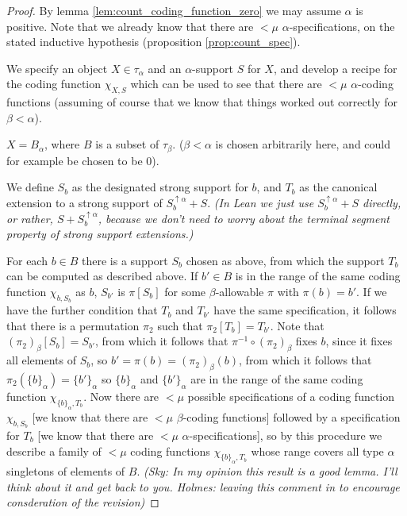 \documentclass[112pt]{article}
\theoremstyle{definition}
\theoremstyle{remark}
\newcommand{\rk}[1]{{\color{blue}\sl #1}}
\newcommand{\rk}[1]{}
\begin{document}
\begin{proof}


{By lemma \ref{lem:count_coding_function_zero} we may assume $\alpha$ is positive.}
Note that we already know that there are $<\mu$ $\alpha$-specifications, on the stated inductive hypothesis {(proposition \ref{prop:count_spec})}.

We specify an object $X\in \tau_\alpha$ and an $\alpha$-support $S$ for $X$, and develop a recipe for the coding function $\chi_{X,S}$ which can be used to see that there are $<\mu$ $\alpha$-coding functions (assuming of course that we know that things worked out correctly for $\beta<\alpha$).


$X = B_\alpha$, where $B$ is a subset of $\tau_\beta$.  ($\beta<\alpha$ is chosen arbitrarily here{, and could for example be chosen to be 0}).

We define $S_b$ as the designated strong support for $b$, and $T_b$ as the canonical extension to a strong support of $S_b^{\uparrow \alpha}+S$. \rk{(In Lean we just use $S_b^{\uparrow \alpha}+S$ directly, or rather, $S+S_b^{\uparrow \alpha}$, because we don't need to worry about the terminal segment property of strong support extensions.)}



For each $b \in B$ there is a support $S_b$ chosen as above, from which the support $T_b$ can be computed as described above.  If $b' \in B$ is in the range of the same coding function $\chi_{b,S_b}$ as $b$, $S_{b'}$ is $\pi[S_{b}]$ for some $\beta$-allowable $\pi$ with $\pi(b) = b'$.
If we have the further condition that $T_b$ and $T_{b'}$ have the same specification, it follows that there is a permutation $\pi_2$ such that $\pi_2[T_b] = T_{b'}$.  Note that $(\pi_2)_\beta[S_b]=S_{b'}$, from which it follows that $\pi^{-1} \circ (\pi_2)_\beta$ fixes $b$, since it fixes all elements of $S_b$, so $b'=\pi(b) = (\pi_2)_\beta(b)$, from which it follows
that $\pi_2(\{b\}_\alpha) = \{b'\}_\alpha$ so $\{b\}_\alpha$ and $\{b'\}_\alpha$ are in the range of the same coding function $\chi_{\{b\}_\alpha,T_b}$.  Now there are $<\mu$ possible specifications of a coding function $\chi_{b,S_b}$ [we know that there are $<\mu$ $\beta$-coding functions]  followed by a specification for $T_b$ [we know that there are $<\mu$ $\alpha$-specifications], so by this procedure we describe a family of $<\mu$ coding functions $\chi_{\{b\}_\alpha,T_b}$ whose range covers all type $\alpha$ singletons of elements of $B$. \rk{(Sky: In my opinion this result is a good lemma. I'll think about it and get back to you.  Holmes: leaving this comment in to encourage consderation of the revision)}



\end{proof}
\end{document}
